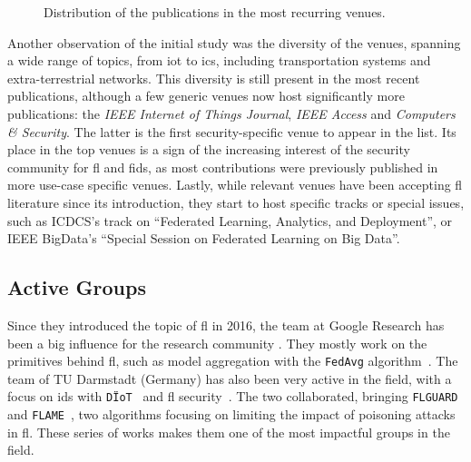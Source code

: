 \begin{figure}
  \centering
  
  \caption{
    Distribution of the publications in the most recurring venues.
    \label{fig:sota.venues}
  }
\end{figure}

Another observation of the initial study was the diversity of the venues, spanning a wide range of topics, from \gls{iot} to \gls{ics}, including transportation systems and extra-terrestrial networks.
This diversity is still present in the most recent publications, although a few generic venues now host significantly more publications: the \emph{IEEE Internet of Things Journal}, \emph{IEEE Access} and \emph{Computers \& Security}.
The latter is the first security-specific venue to appear in the list.
Its place in the top venues is a sign of the increasing interest of the security community for \gls{fl} and \gls{fids}, as most contributions were previously published in more use-case specific venues.
Lastly, while relevant venues have been accepting \gls{fl} literature since its introduction, they start to host specific tracks or special issues, such as ICDCS's track on ``Federated Learning, Analytics, and Deployment'', or IEEE BigData's ``Special Session on Federated Learning on Big Data''.


\subsection{Active Groups\label{sec:sota.quanti.authors}}

Since they introduced the topic of \gls{fl} in 2016, the team at Google Research has been a big influence for the research community \cite{konecny_FederatedLearningStrategies_2016,konecny_FederatedOptimizationDistributed_2016,mcmahan_Communicationefficientlearningdeep_2017,bonawitz_PracticalSecureAggregation_2017,bonawitz_FederatedLearningScale_2019}.
They mostly work on the primitives behind \gls{fl}, such as model aggregation with the \texttt{FedAvg} algorithm~\cite{mcmahan_Communicationefficientlearningdeep_2017}.
The team of TU Darmstadt (Germany) has also been very active in the field, with a focus on \gls{ids} with \texttt{DÏoT}~\cite{marchal_AuDIAutonomousIoT_2019,nguyen_DIoTFederatedSelflearning_2019} and \gls{fl} security~\cite{nguyen_PoisoningAttacksFederated_2020b}.
The two collaborated, bringing \texttt{FLGUARD}~\cite{nguyen_FLGUARDSecurePrivate_2021} and \texttt{FLAME}~\cite{nguyen_FLAMETamingBackdoors_2022}, two algorithms focusing on limiting the impact of poisoning attacks in \gls{fl}.
These series of works makes them one of the most impactful groups in the field.

